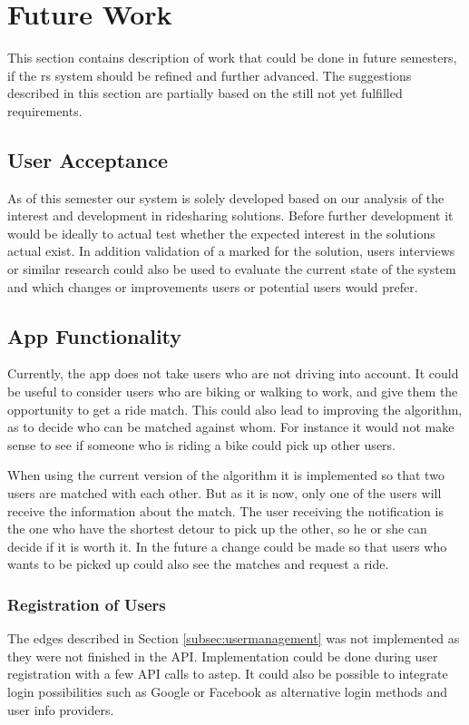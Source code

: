 \section{Future Work}\label{sec:future}
This section contains description of work that could be done in future semesters, if the \gls{rs} system should be refined and further advanced.
The suggestions described in this section are partially based on the still not yet fulfilled requirements.

\subsection{User Acceptance}
As of this semester our system is solely developed based on our analysis of the interest and development in ridesharing solutions.
Before further development it would be ideally to actual test whether the expected interest in the solutions actual exist.
In addition validation of a marked for the solution, users interviews or similar research could also be used to evaluate the current state of the system and which changes or improvements users or potential users would prefer.

\subsection{App Functionality}
Currently, the app does not take users who are not driving into account.
It could be useful to consider users who are biking or walking to work, and give them the opportunity to get a ride match.
This could also lead to improving the algorithm, as to decide who can be matched against whom.
For instance it would not make sense to see if someone who is riding a bike could pick up other users.

When using the current version of the algorithm it is implemented so that two users are matched with each other.
But as it is now, only one of the users will receive the information about the match.
The user receiving the notification is the one who have the shortest detour to pick up the other, so he or she can decide if it is worth it. 
In the future a change could be made so that users who wants to be picked up could also see the matches and request a ride.

\subsubsection*{Registration of Users}
The edges described in Section \ref{subsec:usermanagement} was not implemented as they were not finished in the API.
Implementation could be done during user registration with a few API calls to \gls{astep}.
It could also be possible to integrate login possibilities such as Google or Facebook as alternative login methods and user info providers.

